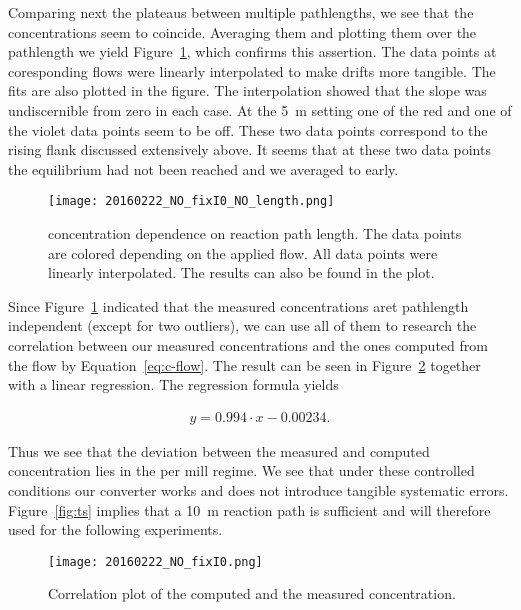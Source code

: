 Comparing next the  plateaus between multiple pathlengths, we
see that the concentrations seem to coincide. Averaging them and
plotting them over the pathlength we yield Figure~\ref{fig:no-length},
which confirms this assertion. The data points at coresponding flows
were linearly interpolated to make drifts more tangible. The fits are
also plotted in the figure. The interpolation showed that the slope
was undiscernible from zero in each case. At the \SI{5}{\meter}
setting one of the red and one of the violet data points seem to be
off. These two data points correspond to the rising flank discussed
extensively above. It seems that at these two data points the
equilibrium had not been reached and we averaged to early.

\begin{figure}[htbp]
  \centering
  \texttt{[image: 20160222\_NO\_fixI0\_NO\_length.png]}
  \caption{ concentration dependence on reaction path
    length. The data points are colored depending on the applied
     flow. All data points were linearly interpolated. The
    results can also be found in the plot.}
  \label{fig:no-length}
\end{figure}

Since Figure~\ref{fig:no-length} indicated that the measured
concentrations aret pathlength independent (except for two outliers),
we can use all of them to research the correlation between our
measured concentrations and the ones computed from the flow by
Equation~\eqref{eq:c-flow}. The result can be seen in
Figure~\ref{fig:no-calib} together with a linear regression. The
regression formula yields

\begin{align*}
  y = 0.994 \cdot x -0.00234.
\end{align*}

Thus we see that the deviation between the measured and computed
concentration lies in the per mill regime. We see that under these
controlled conditions our converter works and does not introduce
tangible systematic errors. Figure~\ref{fig:ts} implies that a
\SI{10}{\meter} reaction path is sufficient and will therefore used
for the following experiments.

\begin{figure}[htbp]
  \centering
  \texttt{[image: 20160222\_NO\_fixI0.png]}
  \caption{Correlation plot of the computed and the measured 
    concentration.}
  \label{fig:no-calib}
\end{figure}

